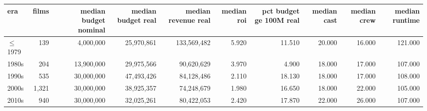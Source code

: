 \begin{tabular}{lrrrrrrrrr}
\toprule
era & films & median budget nominal & median budget real & median revenue real & median roi & pct budget ge 100M real & median cast & median crew & median runtime \\
\midrule
$\leq$1979 & 139 & 4,000,000 & 25,970,861 & 133,569,482 & 5.920 & 11.510 & 20.000 & 16.000 & 121.000 \\
1980s & 204 & 13,900,000 & 29,975,566 & 90,620,629 & 3.970 & 4.900 & 18.000 & 17.000 & 107.000 \\
1990s & 535 & 30,000,000 & 47,493,426 & 84,128,486 & 2.110 & 18.130 & 18.000 & 17.000 & 108.000 \\
2000s & 1,321 & 30,000,000 & 38,925,357 & 74,248,679 & 1.980 & 16.650 & 18.000 & 22.000 & 105.000 \\
2010s & 940 & 30,000,000 & 32,025,261 & 80,422,053 & 2.420 & 17.870 & 22.000 & 26.000 & 107.000 \\
\bottomrule
\end{tabular}